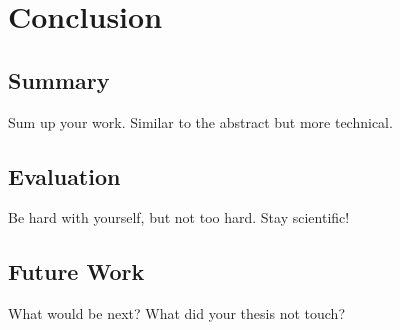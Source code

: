 \documentclass[thesis.tex]{subfiles}
\begin{document}
\chapter{Conclusion}\label{chap:concl}

\section{Summary}
Sum up your work. Similar to the abstract but more technical.

\section{Evaluation}
Be hard with yourself, but not too hard. Stay scientific!

\section{Future Work}
What would be next? What did your thesis not touch?

\subfilebib %
\end{document}
